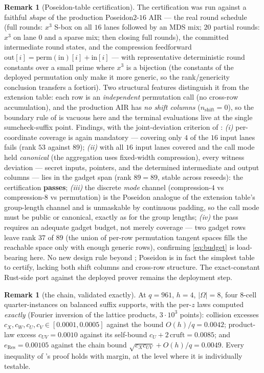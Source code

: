 \documentclass{article}
\theoremstyle{definition}
\newtheorem{remark}[theorem]{Remark}
\begin{document}
\begin{remark}[Poseidon-table certification]\label{rem:numN}
The certification was run against a faithful \emph{shape} of the production Poseidon$2$-$16$ AIR --- the real round schedule (full rounds: $x^3$ S-box on all $16$ lanes followed by an MDS mix; $20$ partial rounds: $x^3$ on lane $0$ and a sparse mix; then closing full rounds), the committed intermediate round states, and the compression feedforward $\mathrm{out}[i] = \mathrm{perm}(\mathrm{in})[i] + \mathrm{in}[i]$ --- with representative deterministic round constants over a small prime where $x^3$ is a bijection (the constants of the deployed permutation only make it more generic, so the rank/genericity conclusion transfers a fortiori). Two structural features distinguish it from the extension table: each row is an \emph{independent} permutation call (no cross-row accumulation), and the production AIR has \emph{no shift columns} ($n_{\mathrm{shift}} = 0$), so the boundary rule of  is vacuous here and the terminal evaluations live at the single sumcheck-suffix point. Findings, with the joint-deviation criterion of : \emph{(i)} per-coordinate coverage is again mandatory --- covering only $4$ of the $16$ input lanes fails (rank $53$ against $89$); \emph{(ii)} with all $16$ input lanes covered and the call mode held \emph{canonical} (the aggregation uses fixed-width compression), every witness deviation --- secret inputs, pointers, and the determined intermediate and output columns --- lies in the gadget span (rank $89 = 89$, stable across reseeds): the certification \textbf{passes}; \emph{(iii)} the discrete \emph{mode} channel (compression-$4$ vs compression-$8$ vs permutation) is the Poseidon analogue of the extension table's group-length channel and is unmaskable by continuous padding, so the call mode must be public or canonical, exactly as for the group lengths; \emph{(iv)} the pass requires an adequate gadget budget, not merely coverage --- two gadget rows leave rank $37$ of $89$ (the union of per-row permutation tangent spaces fills the reachable space only with enough generic rows), confirming \cref{eq:budget} is load-bearing here. No new design rule beyond ; Poseidon is in fact the simplest table to certify, lacking both shift columns and cross-row structure. The exact-constant Rust-side port against the deployed prover remains the deployment step.
\end{remark}

\begin{remark}[the chain, validated exactly]\label{rem:numJ}
At $q = 961$, $h = 4$, $|\Omega| = 8$, four $8$-cell quarter-instances on balanced suffix supports, with the per-$z$ laws computed \emph{exactly} (Fourier inversion of the lattice products, $3 \cdot 10^3$ points): collision excesses $c_X, c_W, c_U, c_V \in [0.0001, 0.0005]$ against the bound $O(h)/q = 0.0042$; product-law excess $c_{UV} = 0.0010$ against its self-bound $c_U + 2\,\mathrm{cruft} = 0.0085$; and $e_{\mathrm{Res}} = 0.00105$ against the chain bound $\sqrt{c_X c_{UV}} + O(h)/q = 0.0049$. Every inequality of 's proof holds with margin, at the level where it is individually testable.
\end{remark}
\end{document}
